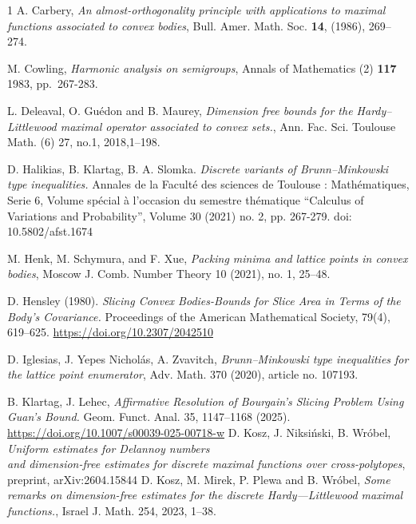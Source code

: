 \documentclass[a4paper,oneside, reqno]{amsart}
\numberwithin{equation}{section}
\theoremstyle{definition}%
\theoremstyle{definition}
\theoremstyle{definition}%
\theoremstyle{definition}
\begin{document}
\begin{thebibliography}{1}
A. Carbery, 
\textit{An almost-orthogonality principle
  with applications to maximal functions associated to convex bodies},
Bull. Amer. Math. Soc.  {\bf 14}, (1986), 269--274.

M. Cowling,
\textit{Harmonic analysis on semigroups}, Annals of Mathematics (2) {\bf 117} 1983, pp.\ 267-283.


 L. Deleaval, O. Guédon and B. Maurey,
\emph{Dimension free bounds for the Hardy–Littlewood maximal operator associated to convex sets.},  
Ann. Fac. Sci. Toulouse Math. (6) 27, no.1, 2018,1--198.


D. Halikias, B. Klartag, B. A. Slomka. \textit{Discrete variants of Brunn–Minkowski type inequalities.} Annales de la Faculté des sciences de Toulouse : Mathématiques, Serie 6, Volume spécial à l’occasion du semestre thématique “Calculus of Variations and Probability”, Volume 30 (2021) no. 2, pp. 267-279. doi: 10.5802/afst.1674

M. Henk, M. Schymura, and F. Xue,
\textit{Packing minima and lattice points in convex bodies},
Moscow J. Comb. Number Theory 10 (2021), no. 1, 25--48.

D. Hensley (1980). \textit{ Slicing Convex Bodies-Bounds for Slice Area in Terms of the Body’s Covariance.} Proceedings of the American Mathematical Society, 79(4), 619–625. \url{https://doi.org/10.2307/2042510}

D. Iglesias, J. Yepes Nicholás, A. Zvavitch, \textit{Brunn–Minkowski type inequalities for the lattice point enumerator}, Adv. Math. 370 (2020), article no. 107193.

B. Klartag, J. Lehec, \textit{Affirmative Resolution of Bourgain’s Slicing Problem Using Guan’s Bound.} Geom. Funct. Anal. 35, 1147–1168 (2025). \url{https://doi.org/10.1007/s00039-025-00718-w}
D. Kosz, J. Niksiński, B. Wróbel, \textit{Uniform estimates for Delannoy numbers \\ and dimension-free estimates for discrete maximal functions over cross-polytopes}, preprint, arXiv:2604.15844
D. Kosz, M. Mirek, P. Plewa and B. Wróbel,
\emph{Some remarks on dimension-free estimates for the discrete Hardy—Littlewood maximal functions.},
Israel J. Math. 254, 2023, 1--38. 


\end{thebibliography}
\end{document}
